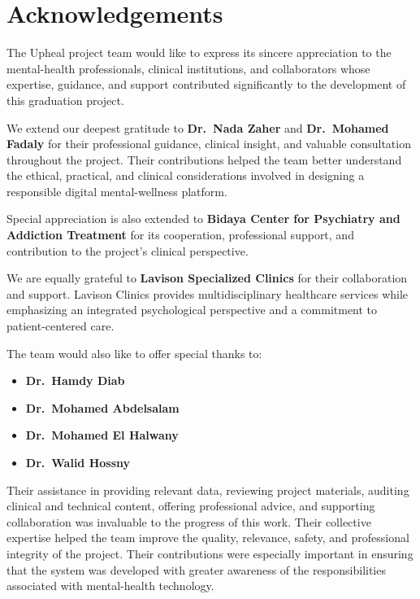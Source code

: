 \documentclass[
  letterpaper,
  12pt,
  a4paper,
  openany]{report}
\providecommand{\tightlist}{%
  \setlength{\itemsep}{0pt}\setlength{\parskip}{0pt}}
\begin{document}

\chapter*{Acknowledgements}\label{acknowledgements}


The Upheal project team would like to express its sincere appreciation
to the mental-health professionals, clinical institutions, and
collaborators whose expertise, guidance, and support contributed
significantly to the development of this graduation project.

We extend our deepest gratitude to \textbf{Dr.~Nada Zaher} and
\textbf{Dr.~Mohamed Fadaly} for their professional guidance, clinical
insight, and valuable consultation throughout the project. Their
contributions helped the team better understand the ethical, practical,
and clinical considerations involved in designing a responsible digital
mental-wellness platform.

Special appreciation is also extended to \textbf{Bidaya Center for
Psychiatry and Addiction Treatment} for its cooperation, professional
support, and contribution to the project's clinical perspective.

We are equally grateful to \textbf{Lavison Specialized Clinics} for
their collaboration and support. Lavison Clinics provides
multidisciplinary healthcare services while emphasizing an integrated
psychological perspective and a commitment to patient-centered care.

The team would also like to offer special thanks to:

\begin{itemize}
\tightlist
\item
  \textbf{Dr.~Hamdy Diab}
\item
  \textbf{Dr.~Mohamed Abdelsalam}
\item
  \textbf{Dr.~Mohamed El Halwany}
\item
  \textbf{Dr.~Walid Hossny}
\end{itemize}

Their assistance in providing relevant data, reviewing project
materials, auditing clinical and technical content, offering
professional advice, and supporting collaboration was invaluable to the
progress of this work. Their collective expertise helped the team
improve the quality, relevance, safety, and professional integrity of
the project. Their contributions were especially important in ensuring
that the system was developed with greater awareness of the
responsibilities associated with mental-health technology.
\end{document}
